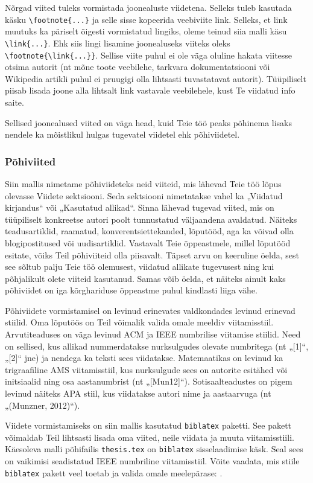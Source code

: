 Nõrgad viited tuleks vormistada joonealuste viidetena. Selleks tuleb kasutada käsku \verb|\footnote{...}| ja selle sisse kopeerida veebiviite link. Selleks, et link muutuks ka päriselt õigesti vormistatud lingiks, oleme teinud siia malli käsu \verb|\link{...}|. Ehk siis lingi lisamine joonealuseks viiteks oleks \verb|\footnote{\link{...}}|. Sellise viite puhul ei ole väga oluline hakata viitesse otsima autorit (nt mõne toote veebilehe, tarkvara dokumentatsiooni või Wikipedia artikli puhul ei pruugigi olla lihtsasti tuvastatavat autorit). Tüüpiliselt piisab lisada joone alla lihtsalt link vastavale veebilehele, kust Te viidatud info saite.

Sellised joonealused viited on väga head, kuid Teie töö peaks põhinema lisaks nendele ka mõistlikul hulgas tugevatel viidetel ehk põhiviidetel.

\subsubsection{Põhiviited}
Siin mallis nimetame põhiviideteks neid viiteid, mis lähevad Teie töö lõpus olevasse Viidete sektsiooni. Seda sektsiooni nimetatakse vahel ka „Viidatud kirjandus“ või „Kasutatud allikad“. Sinna lähevad tugevad viited, mis on tüüpiliselt konkreetse autori poolt tunnustatud väljaandena avaldatud. Näiteks teadusartiklid, raamatud, konverentsiettekanded, lõputööd, aga ka võivad olla blogipostitused või uudisartiklid. Vastavalt Teie õppeastmele, millel lõputööd esitate, võiks Teil põhiviiteid olla piisavalt. Täpset arvu on keeruline öelda, sest see sõltub palju Teie töö olemusest, viidatud allikate tugevusest ning kui põhjalikult olete viiteid kasutanud. Samas võib öelda, et näiteks ainult kaks põhiviidet on iga kõrghariduse õppeastme puhul kindlasti liiga vähe.

Põhiviidete vormistamisel on levinud erinevates valdkondades levinud erinevad stiilid. Oma lõputöös on Teil võimalik valida omale meeldiv viitamisstiil. Arvutiteaduses on väga levinud ACM ja IEEE numbrilise viitamise stiilid. Need on sellised, kus allikad nummerdatakse nurksulgudes olevate numbritega (nt „[1]“, „[2]“ jne) ja nendega ka teksti sees viidatakse. Matemaatikas on levinud ka trigraafiline AMS viitamisstiil, kus nurksulgude sees on autorite esitähed või initsiaalid ning osa aastanumbrist (nt „[Mun12]“). Sotisaalteadustes on pigem levinud näiteks APA stiil, kus viidatakse autori nime ja aastaarvuga (nt „(Munzner, 2012)“).

Viidete vormistamiseks on siin mallis kasutatud \verb|biblatex| paketti. See pakett võimaldab Teil lihtsasti lisada oma viited, neile viidata ja muuta viitamisstiili. Käesoleva malli põhifailis \verb|thesis.tex| on \verb|biblatex| sisselaadimise käsk. Seal sees on vaikimisi seadistatud IEEE numbriline viitamisstiil. Võite vaadata, mis stiile \verb|biblatex| pakett veel toetab ja valida omale meelepärase: .

